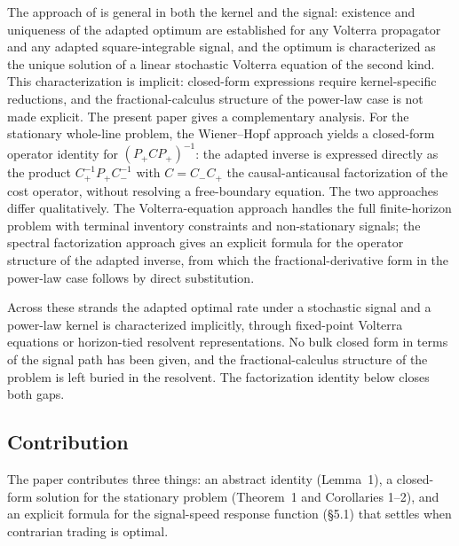 \documentclass[11pt]{article}
\theoremstyle{plain}
\begin{document}
The approach of \citet{AbiJaberNeuman2025} is general in both the kernel and the signal: existence and uniqueness of the adapted optimum are established for any Volterra propagator and any adapted square-integrable signal, and the optimum is characterized as the unique solution of a linear stochastic Volterra equation of the second kind. This characterization is implicit: closed-form expressions require kernel-specific reductions, and the fractional-calculus structure of the power-law case is not made explicit. The present paper gives a complementary analysis. For the stationary whole-line problem, the Wiener--Hopf approach yields a closed-form operator identity for $(P_+CP_+)^{-1}$: the adapted inverse is expressed directly as the product $C_+^{-1}P_+C_-^{-1}$ with $C = C_-C_+$ the causal-anticausal factorization of the cost operator, without resolving a free-boundary equation. The two approaches differ qualitatively. The Volterra-equation approach handles the full finite-horizon problem with terminal inventory constraints and non-stationary signals; the spectral factorization approach gives an explicit formula for the operator structure of the adapted inverse, from which the fractional-derivative form in the power-law case follows by direct substitution.

Across these strands the adapted optimal rate under a stochastic signal and a power-law kernel is characterized implicitly, through fixed-point Volterra equations or horizon-tied resolvent representations. No bulk closed form in terms of the signal path has been given, and the fractional-calculus structure of the problem is left buried in the resolvent. The factorization identity below closes both gaps.

\subsection{Contribution}

The paper contributes three things: an abstract identity (Lemma~1), a closed-form solution for the stationary problem (Theorem~1 and Corollaries 1--2), and an explicit formula for the signal-speed response function (\S5.1) that settles when contrarian trading is optimal.
\end{document}
